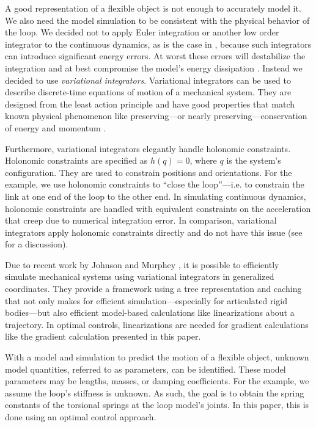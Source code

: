 \documentclass[letterpaper, 10pt, conference]{ieeeconf}
\begin{document}
A good representation of a flexible object is not enough to accurately model it.  We also need the model simulation to be consistent with the physical behavior of the loop.  We decided not to apply Euler integration or another low order integrator to the continuous dynamics, as is the case in \cite{sahari_etal}, because such integrators can introduce significant energy errors.  At worst these errors will destabilize the integration and at best compromise the model's energy dissipation \cite{johnson_murphey_scalable}.  Instead we decided to use \emph{variational integrators}.  Variational integrators can be used to describe discrete-time equations of motion of a mechanical system.  They are designed from the least action principle and have good properties that match known physical phenomenon like preserving---or nearly preserving---conservation of energy and momentum \cite{johnson_murphey_scalable, marsden_west}.

Furthermore, variational integrators elegantly handle holonomic constraints.  Holonomic constraints are specified as $h(q) = 0$, where $q$ is the system's configuration.  They are used to constrain positions and orientations.  For the example, we use holonomic constraints to ``close the loop''---i.e. to constrain the link at one end of the loop to the other end.  In simulating continuous dynamics, holonomic constraints are handled with equivalent constraints on the acceleration that creep due to numerical integration error.  In comparison, variational integrators apply holonomic constraints directly and do not have this issue (see \cite{johnson_murphey_scalable} for a discussion).

Due to recent work by Johnson and Murphey \cite{johnson_murphey_scalable, johnson_murphey_linearization}, it is possible to efficiently simulate mechanical systems using variational integrators in generalized coordinates. They provide a framework using a tree representation and caching that not only makes for efficient simulation---especially for articulated rigid bodies---but also efficient model-based calculations like linearizations about a trajectory.   In optimal controls, linearizations are needed for gradient calculations like the gradient calculation presented in this paper. 

With a model and simulation to predict the motion of a flexible object, unknown model quantities, referred to as parameters, can be identified.  These model parameters may be lengths, masses, or damping coefficients.  For the example, we assume the loop's stiffness is unknown.  As such, the goal is to obtain the spring constants of the torsional springs at the loop model's joints.  In this paper, this is done using an optimal control approach.
\end{document}
